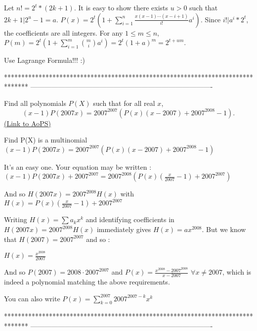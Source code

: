 \begin{solution}
	Let $ n!=2^t*(2k+1)$. It is easy to show there exists $ u>0$ such that $ 2k+1|2^u-1=a$.
$ P(x)=2^t(1+\sum_{i=1}^n\frac{x(x-1)\cdots(x-i+1)}{i!}a^i)$.
Since $ i!|a^i*2^t$, the coefficients are all integers.
For any $ 1\le m\le n$,
$ P(m)=2^t(1+\sum_{i=1}^m\binom{m}{i}a^i)=2^t(1+a)^m=2^{t+um}$.
\end{solution}



\begin{solution}
	Use Lagrange Formula!!! :)
\end{solution}
*******************************************************************************
-------------------------------------------------------------------------------

\begin{problem}
	Find all polynomials $P(X)$ such that for all real $x$,
\[(x-1)P(2007x)=2007^{2007}(P(x)(x-2007)+2007^{2008}-1).\]
	\flushright \href{https://artofproblemsolving.com/community/c6h193171}{(Link to AoPS)}
\end{problem}



\begin{solution}
	\begin{tcolorbox}Find P(X) is a multinomial
$ (x-1)P(2007x)=2007^{2007}(P(x)(x-2007)+2007^{2008}-1)$\end{tcolorbox}

It's an easy one. Your equation may be written : $ (x-1)P(2007x)+2007^{2007}=2007^{2008}(P(x)(\frac{x}{2007}-1)+2007^{2007})$

And so $ H(2007x)=2007^{2008}H(x)$ with $ H(x)=P(x)(\frac{x}{2007}-1)+2007^{2007}$

Writing $ H(x)=\sum a_kx^k$ and identifying coefficients in $ H(2007x)=2007^{2008}H(x)$  immediately gives $ H(x)=ax^{2008}$. But we know that $ H(2007)=2007^{2007}$ and so :

$ H(x)=\frac{x^{2008}}{2007}$

And so $ P(2007)=2008\cdot 2007^{2007}$ and $ P(x)=\frac{x^{2008}-2007^{2008}}{x-2007}$ $ \forall x\neq 2007$, which is indeed a polynomial matching the above requirements.

You can also write $ P(x)=\sum_{k=0}^{2007}2007^{2007-k}x^k$
\end{solution}
*******************************************************************************
-------------------------------------------------------------------------------

